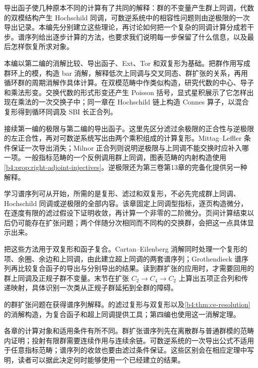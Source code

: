 
\BookPartGuide
导出函子使几种原本不同的计算有了共同的解释：群的不变量产生群上同调，代数的双模结构产生 Hochschild 同调，可数逆系统中的相容性问题则由逆极限的一次导出记录。本编先分别建立这些理论，再讨论如何把一个复杂的同调计算分成若干步。谱序列给出逐步计算的方法，也要求我们说明每一步保留了什么信息，以及最后怎样恢复所求对象。

\ProseParagraphBreak
本编以第二编的消解比较、导出函子、Ext、Tor 和双复形为基础。把群作用写成群环上的模，构造 bar 消解，解释低次上同调与交叉同态、群扩张的关系，再用循环群的周期消解作具体计算。在双模范畴中作类似构造，研究代数的中心、导子和乘法形变。交换代数的形式形变还产生 Poisson 括号，显式星积展示了它怎样出现在乘法的一次交换子中；同一章在 Hochschild 链上构造 Connes 算子，以混合复形得到循环同调及 SBI 长正合列。

\ProseParagraphBreak
{}接续第一编的极限与第二编的导出函子。这里先区分滤过余极限的正合性与逆极限的左正合性，再对可数逆系统写出由两个乘积组成的计算复形。Mittag--Leffler 条件保证一次导出消失；Milnor 正合列则说明逆极限与上同调不能交换时应补入哪一项。一般指标范畴的一个反例调用群上同调，图表范畴的内射构造使用\cref{b4:prop:right-adjoint-injectives}。逆极限还为第三卷第13章的完备化提供另一种解释。

\ProseParagraphBreak
学习谱序列可从开始，所需的是复形、滤过和双复形，不必先完成群上同调、Hochschild 同调或逆极限的全部内容。该章固定上同调型指标，逐页构造微分，在逐度有限的滤过假设下证明收敛，再计算一个非零的二阶微分。页间计算结束以后仍可能存在扩张问题；两个伴随分次相同而不同构的交换群，会把这一点具体显示出来。

\ProseParagraphBreak
{}把这些方法用于双复形和函子复合。Cartan--Eilenberg 消解同时处理一个复形的项、余圈、余边和上同调，由此建立超上同调的两套谱序列；Grothendieck 谱序列再比较复合函子的导出与分别导出的结果。读到群扩张的应用时，才需要回用的群上同调及正规子群不变量。末节在扩张 \(C_2\to C_4\to C_2\) 上算出五项正合列和传递映射，具体识别一次类从正规子群延拓到全群的障碍。

\ProseParagraphBreak
{}的群扩张问题在获得谱序列解释。的滤过复形与双复形以及\cref{b4:thm:ce-resolution}的消解构造，为复合函子和超上同调提供工具；第四编也使用这一消解定理。

\ProseParagraphBreak
各章的计算对象和适用条件有所不同。群扩张谱序列先在离散群与普通群模的范畴内证明；投射有限群需要连续作用与连续余链。可数逆系统的一次导出公式不适用于任意指标范畴；谱序列的收敛也要由滤过条件保证。这些区别会在相应定理中写明，读者可以据此决定何时能够使用一个已经建立的结果。

